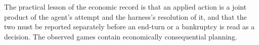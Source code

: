 The practical lesson of the economic record is that an applied action is a joint product of the agent's attempt and the harness's resolution of it, and that the two must be reported separately before an end-turn or a bankruptcy is read as a decision. The observed games contain economically consequential planning.
